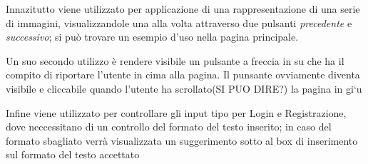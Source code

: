 Innazitutto viene utilizzato per applicazione di una rappresentazione di una serie di immagini, visualizzandole
una alla volta attraverso due pulsanti \textit{precedente} e \textit{successivo}; si può trovare un esempio d'uso
nella pagina principale.

Un suo secondo utilizzo è rendere visibile un pulsante a freccia in su che ha il compito di riportare l'utente
in cima alla pagina. Il punsante ovviamente diventa visibile e cliccabile quando l'utente ha scrollato(SI PUO DIRE?) la pagina in gi`u 

Infine viene utilizzato per controllare gli input tipo per Login e Registrazione, dove neccessitano di un controllo del formato
del testo inserito; in caso del formato sbagliato verrà visualizzata un suggerimento sotto al box di inserimento sul formato del
testo accettato